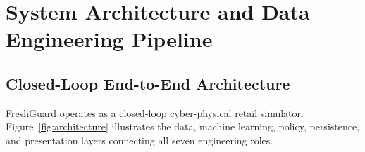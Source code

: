 \documentclass[11pt,a4paper]{article}
\renewcommand{\_}{\oldunderscore\allowbreak}
\begin{document}
\section{System Architecture and Data Engineering Pipeline}

\subsection{Closed-Loop End-to-End Architecture}
FreshGuard operates as a closed-loop cyber-physical retail simulator. Figure~\ref{fig:architecture} illustrates the data, machine learning, policy, persistence, and presentation layers connecting all seven engineering roles.
\end{document}
